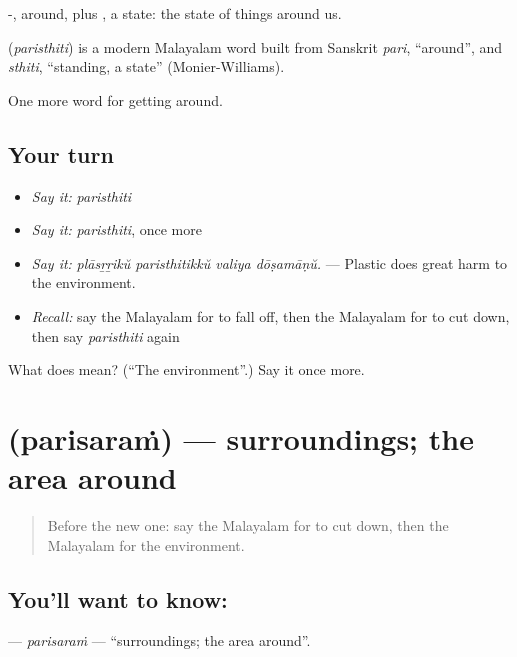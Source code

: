 -, around, plus , a state: the state of things around us.

\begin{cousinweb}
\textbf{} (\emph{paristhiti}) is a modern Malayalam word built from Sanskrit \emph{pari}, \textquotedblleft{}around\textquotedblright{}, and \emph{sthiti}, \textquotedblleft{}standing, a state\textquotedblright{} (Monier-Williams).
\end{cousinweb}

\begin{grammarlens}[title={What you've built}]
One more word for getting around.
\end{grammarlens}

\subsection*{Your turn}
\begin{itemize}
\raggedright
  \item \emph{Say it:} \emph{paristhiti}
  \item \emph{Say it:} \emph{paristhiti}, once more
  \item \emph{Say it:} \emph{plāsṟṟikŭ paristhitikkŭ valiya dōṣamāṇŭ.} — Plastic does great harm to the environment.
  \item \emph{Recall:} say the Malayalam for to fall off, then the Malayalam for to cut down, then say \emph{paristhiti} again
\end{itemize}

\begin{tcolorbox}[breakable,colback=teal!4,colframe=teal!35!black,title={Before you move on}]
What does  mean? (\textquotedblleft{}The environment\textquotedblright{}.) Say it once more.
\end{tcolorbox}
\section[\texorpdfstring{\ml{പരിസരം} (parisaraṁ)}{പരിസരം (parisaraṁ)}]{ (parisaraṁ) — surroundings; the area around}

\label{lesson:ML-C503-parisaram}



\begin{quote}
Before the new one: say the Malayalam for to cut down, then the Malayalam for the environment.
\end{quote}

\subsection*{You'll want to know: }
\textbf{} — \emph{parisaraṁ} — \textquotedblleft{}surroundings; the area around\textquotedblright{}.


